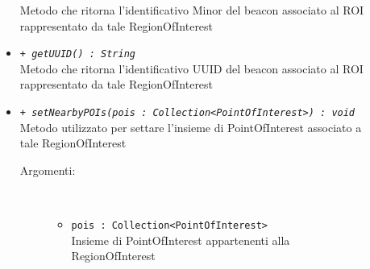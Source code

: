 \documentclass[../DefinizioneDiProdotto.tex]{subfiles}
\begin{document}
\begin{description}
\begin{itemize}
		Metodo che ritorna l'identificativo Minor del beacon associato al ROI rappresentato da tale RegionOfInterest
		\item \texttt{+ \textit{getUUID() : String}}\\
		Metodo che ritorna l'identificativo UUID del beacon associato al ROI rappresentato da tale RegionOfInterest
		\item \texttt{+ \textit{setNearbyPOIs(pois : Collection<PointOfInterest>) : void}}\\
		Metodo utilizzato per settare l'insieme di PointOfInterest associato a tale RegionOfInterest
		\begin{description}
			\item[Argomenti:] \
			\begin{itemize}
				\item \texttt{pois : Collection<PointOfInterest>}\\
				Insieme di PointOfInterest appartenenti alla RegionOfInterest\end{itemize}
		\end{description}
	\end{itemize}
\end{description}
\end{document}

